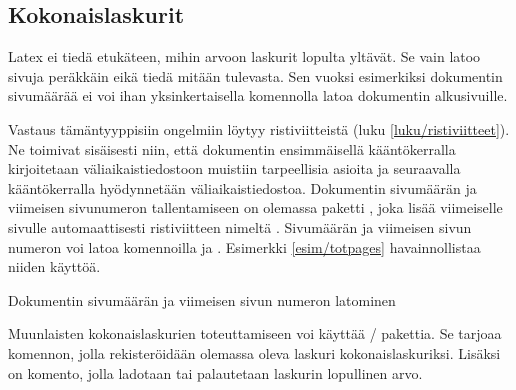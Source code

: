 \begin{koodilohkosis}
\renewcommand{\theoma}{\arabic{page}/\alph{oma}}
\end{koodilohkosis}

\subsection{Kokonaislaskurit}

Latex ei tiedä etukäteen, mihin arvoon laskurit lopulta yltävät. Se vain
latoo sivuja peräkkäin eikä tiedä mitään tulevasta. Sen vuoksi
esimerkiksi dokumentin sivumäärää ei voi ihan yksinkertaisella
komennolla latoa dokumentin alkusivuille.

Vastaus tämäntyyppisiin ongelmiin löytyy ristiviitteistä (luku
\ref{luku/ristiviitteet}). Ne toimivat sisäisesti niin, että dokumentin
ensimmäisellä kääntökerralla kirjoitetaan väliaikaistiedostoon muistiin
tarpeellisia asioita ja seuraavalla kääntökerralla hyödynnetään
väliaikaistiedostoa. Dokumentin sivumäärän ja viimeisen sivunumeron
tallentamiseen on olemassa paketti , joka lisää
viimeiselle sivulle automaattisesti ristiviitteen nimeltä
. Sivumäärän ja viimeisen sivun numeron voi latoa
komennoilla  ja . Esimerkki
\ref{esim/totpages} havainnollistaa niiden käyttöä.

\begin{esimerkki*}

  \caption{Dokumentin sivumäärän ja viimeisen sivun numeron latominen}
  \label{esim/totpages}
\end{esimerkki*}

Muunlaisten kokonaislaskurien toteuttamiseen voi käyttää
\-/ pakettia. Se tarjoaa komennon, jolla
rekisteröidään olemassa oleva laskuri kokonaislaskuriksi. Lisäksi on
komento, jolla ladotaan tai palautetaan laskurin lopullinen arvo.

